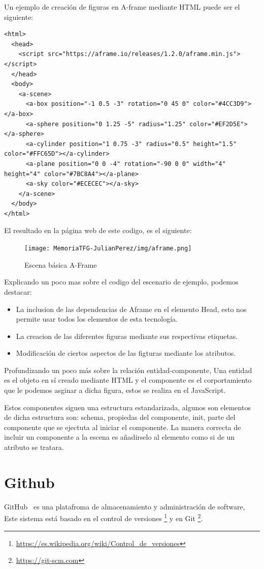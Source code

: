 \documentclass[a4paper, 12pt]{book}
\begin{document}
Un ejemplo de creación de figuras en A-frame mediante HTML puede ser el siguiente:\begin{verbatim}
<html>
  <head>
    <script src="https://aframe.io/releases/1.2.0/aframe.min.js"></script>
  </head>
  <body>
    <a-scene>
      <a-box position="-1 0.5 -3" rotation="0 45 0" color="#4CC3D9"></a-box>
      <a-sphere position="0 1.25 -5" radius="1.25" color="#EF2D5E"></a-sphere>
      <a-cylinder position="1 0.75 -3" radius="0.5" height="1.5" color="#FFC65D"></a-cylinder>
      <a-plane position="0 0 -4" rotation="-90 0 0" width="4" height="4" color="#7BC8A4"></a-plane>
      <a-sky color="#ECECEC"></a-sky>
    </a-scene>
  </body>
</html>
\end{verbatim}

El resultado en la página web de este codigo, es el siguiente:

\begin{figure}[H]
  \centering
  \texttt{[image: MemoriaTFG-JulianPerez/img/aframe.png]}
  \caption{Escena básica A-Frame}\label{aframe}
\end{figure}

Explicando un poco mas sobre el codigo del escenario de ejemplo, podemos destacar: 

\begin{itemize}
    \item La inclusion de las dependencias de Aframe en el elemento Head, esto nos permite usar todos los elementos de esta tecnología.
    \item La creacion de las diferentes figuras mediante sus respectivas etiquetas.
    \item Modificación de ciertos aspectos de las figturas mediante los atributos.
\end{itemize}

Profundizando un poco más sobre la relación entidad-componente, Una entidad es el objeto en sí creado mediante HTML y el componente es el corportamiento que le podemos asginar a dicha figura, estos se realiza en el JavaScript. 

Estos componentes siguen una estructura estandarizada, algunos son elementos de dicha estructura son: schema, propiedas del componente, init, parte del componente que se ejectuta al iniciar el componente. La manera correcta de incluir un componente a la escena es añadirselo al elemento como si de un atributo se tratara.

 
\section{Github} %
\label{sec:GitHub}
GitHub~\cite{GITHUB} es una platafroma de almacenamiento y administración  de software, Este sistema está basado en el control de versiones \footnote{\url{https://es.wikipedia.org/wiki/Control_de_versiones}} y en Git \footnote{\url{https://git-scm.com}}.
\end{document}
